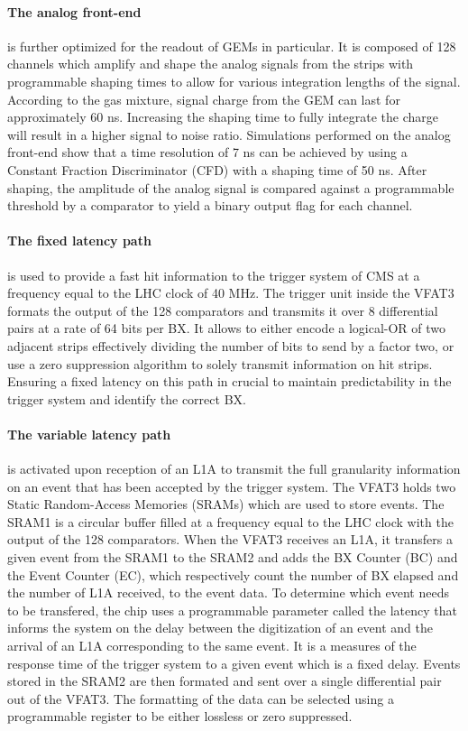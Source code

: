       \paragraph{The analog front-end} is further optimized for the readout of GEMs in particular. It is composed of 128 channels which amplify and shape the analog signals from the strips with programmable shaping times to allow for various integration lengths of the signal. According to the gas mixture, signal charge from the GEM can last for approximately 60 ns. Increasing the shaping time to fully integrate the charge will result in a higher signal to noise ratio. Simulations performed on the analog front-end show that a time resolution of 7 ns can be achieved by using a Constant Fraction Discriminator (CFD) with a shaping time of 50 ns. After shaping, the amplitude of the analog signal is compared against a programmable threshold by a comparator to yield a binary output flag for each channel. \\

      \paragraph{The fixed latency path} is used to provide a fast hit information to the trigger system of CMS at a frequency equal to the LHC clock of 40 MHz. The trigger unit inside the VFAT3 formats the output of the 128 comparators and transmits it over 8 differential pairs at a rate of 64 bits per BX. It allows to either encode a logical-OR of two adjacent strips effectively dividing the number of bits to send by a factor two, or use a zero suppression algorithm to solely transmit information on hit strips. Ensuring a fixed latency on this path in crucial to maintain predictability in the trigger system and identify the correct BX. \\

      \paragraph{The variable latency path} is activated upon reception of an L1A to transmit the full granularity information on an event that has been accepted by the trigger system. The VFAT3 holds two Static Random-Access Memories (SRAMs) which are used to store events. The SRAM1 is a circular buffer filled at a frequency equal to the LHC clock with the output of the 128 comparators. When the VFAT3 receives an L1A, it transfers a given event from the SRAM1 to the SRAM2 and adds the BX Counter (BC) and the Event Counter (EC), which respectively count the number of BX elapsed and the number of L1A received, to the event data. To determine which event needs to be transfered, the chip uses a programmable parameter called the latency that informs the system on the delay between the digitization of an event and the arrival of an L1A corresponding to the same event. It is a measures of the response time of the trigger system to a given event which is a fixed delay. Events stored in the SRAM2 are then formated and sent over a single differential pair out of the VFAT3. The formatting of the data can be selected using a programmable register to be either lossless or zero suppressed. \\

